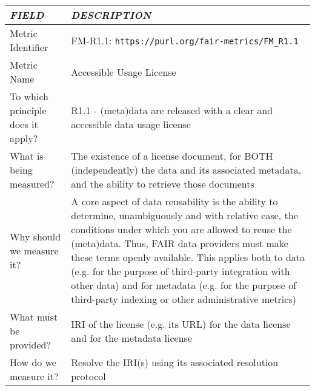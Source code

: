 \documentclass[english]{article}
\begin{document}
\begin{longtable}{|p{5cm}|p{9cm}|}


\hline
\emph{FIELD} & \emph{DESCRIPTION} \\
\hline
Metric Identifier &   FM-R1.1: \verb"https://purl.org/fair-metrics/FM_R1.1"
\\


\hline
Metric Name &   

Accessible Usage License


 \\



\hline
To which principle does it apply? &   



R1.1 - (meta)data are released with a clear and accessible data usage license

\\



\hline
What is being measured? & 

The existence of a license document, for BOTH (independently) the data and its associated metadata, and the ability to retrieve those documents


\\



\hline
Why should we measure it? & 


A core aspect of data reusability is the ability to determine, unambiguously and with relative ease, the conditions under which you are allowed to reuse the (meta)data.  Thus, FAIR data providers must make these terms openly available.  This applies both to data (e.g. for the purpose of third-party integration with other data) and for metadata (e.g. for the purpose of third-party indexing or other administrative metrics)

  
\\



\hline
What must be provided? &  


IRI of the license (e.g. its URL) for the data license and for the metadata license

\\



\hline
How do we measure it? &  

Resolve the IRI(s) using its associated resolution protocol




\end{longtable}
\end{document}
